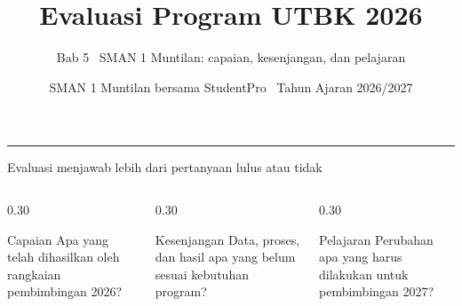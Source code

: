 \renewcommand{\currentchapter}{5}
\title{Evaluasi Program UTBK 2026}
\subtitle{Bab 5 \textbar\ SMAN 1 Muntilan: capaian, kesenjangan, dan pelajaran}
\date{SMAN 1 Muntilan bersama StudentPro \textbar\ Tahun Ajaran 2026/2027}

\begingroup
{}
\begin{frame}[plain]
  \vspace{0.65cm}
  \vspace{0.08cm}
  {\color{StudentWhite}\inserttitle\par}
  \vspace{0.38cm}
  {\color{StudentSoft}\insertsubtitle\par}
  \vfill
  {\color{StudentGold}\rule{2.3cm}{2.5pt}}\par
  \vspace{0.20cm}
  {\color{StudentWhite}\insertauthor}\par
  {\color{StudentSoft}\insertdate}
  \vspace{0.42cm}
\end{frame}
\endgroup

\begin{frame}{Evaluasi menjawab lebih dari pertanyaan lulus atau tidak}
  \begin{columns}[T,onlytextwidth]
    \begin{column}{0.30\textwidth}
      \begin{block}{Capaian}
        Apa yang telah dihasilkan oleh rangkaian pembimbingan 2026?
      \end{block}
    \end{column}
    \begin{column}{0.30\textwidth}
      \begin{block}{Kesenjangan}
        Data, proses, dan hasil apa yang belum sesuai kebutuhan program?
      \end{block}
    \end{column}
    \begin{column}{0.30\textwidth}
      \begin{block}{Pelajaran}
        Perubahan apa yang harus dilakukan untuk pembimbingan 2027?
      \end{block}
    \end{column}
  \end{columns}
  \vspace{0.28cm}
\end{frame}

